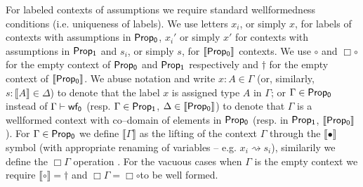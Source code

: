 	
	For labeled contexts of assumptions we require standard wellformedness conditions (i.e. uniqueness of labels).
	We use letters $x_i$, or simply $x$, for labels of  contexts with assumptions in $\sf Prop_0$, $x_i'$ or simply $x'$ for contexts with assumptions in   $\sf Prop_1$ and $s_i$, or simply $s$,  
	for $\sf \llbracket Prop_0 \rrbracket$ contexts. 
	We use $\circ$ and $\Box\circ$ for the empty context of ${\sf Prop_0}$ and ${\sf Prop_1}$ respectively
	and  $\dagger$ for the empty context of ${ \llbracket {\sf Prop_0}\rrbracket}$.
	We abuse notation and write $x:A\in\Gamma$ 
	(or, similarly, $s:\llbracket A\rrbracket\in\Delta$) 
	to denote that the label $x$ is assigned type $A$ in $\Gamma$; 
	or $\Gamma\in {\sf Prop_0}$ instead of ${\Gamma}\vdash {\sf wf_0}$
	(resp. $\Gamma \in {\sf Prop_1}$, $\Delta\in {\sf \llbracket Prop_0\rrbracket}$)  
	to denote that  $\Gamma$ is a wellformed context  with  co--domain of elements in ${\sf Prop_0}$ (resp. in ${\sf Prop_1}$, $\llbracket {\sf Prop_0}\rrbracket$).
	For $\Gamma \in {\sf Prop_0}$ we define  $\llbracket \Gamma\rrbracket$ as 
	 the lifting of the context $\Gamma$ through the $\llbracket \bullet \rrbracket$  symbol 
	(with appropriate renaming of variables -- e.g. $x_i\rightsquigarrow s_i$), similarily
	we define the $\Box \Gamma$ operation . 
	For the vacuous cases  when $\Gamma$  is  the empty context
	we require $\llbracket\circ \rrbracket = \dagger$  
	and $\Box \Gamma=\Box\circ$to be well formed.
	
